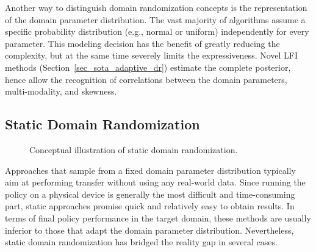 \documentclass[utf8]{frontiersSCNS} %
\begin{document}
Another way to distinguish domain randomization concepts is the representation of the domain parameter distribution.
The vast majority of algorithms assume a specific probability distribution (e.g., normal or uniform) independently for every parameter.
This modeling decision has the benefit of greatly reducing the complexity, but at the same time severely limits the expressiveness.
Novel \acs{LFI} methods (Section~\ref{sec_sota_adaptive_dr}) estimate the complete posterior, hence allow the recognition of correlations between the domain parameters, multi-modality, and skewness.

\subsection{Static Domain Randomization}
\label{sec_sota_static_dr}
\begin{figure} %
	\raggedleft
	\vspace*{-1.35\baselineskip}
	
	\vspace*{-2.3\baselineskip}
	\caption{Conceptual illustration of static domain randomization.}
	\label{fig_sota_static_dr}
\end{figure}
Approaches that sample from a fixed domain parameter distribution typically aim at performing \simtoreal transfer without using any real-world data.
Since running the policy on a physical device is generally the most difficult and time-consuming part, static approaches promise quick and relatively easy to obtain results.
In terms of final policy performance in the target domain, these methods are usually inferior to those that adapt the domain parameter distribution.
Nevertheless, static domain randomization has bridged the reality gap in several cases.

\end{document}
